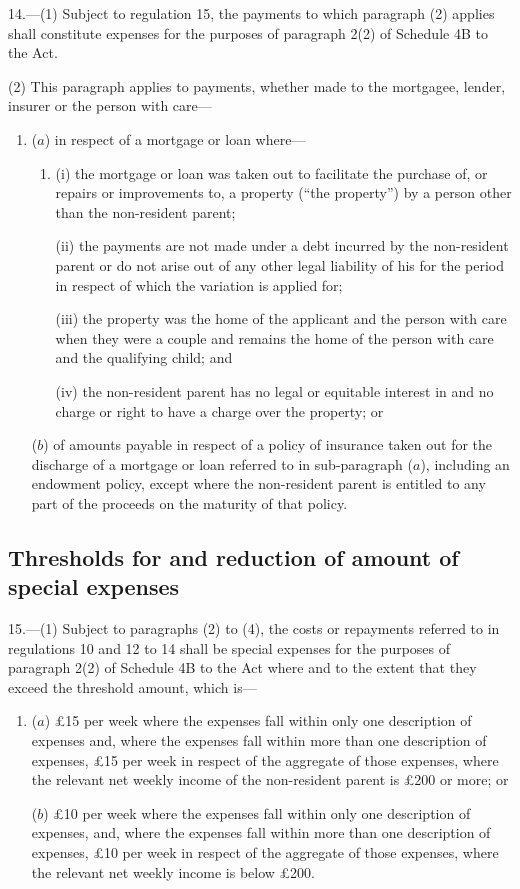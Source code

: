 \documentclass[12pt,a4paper]{article}
\begin{document}
14.---(1)  Subject to regulation 15, the payments to which paragraph (2) applies shall constitute expenses for the purposes of paragraph 2(2) of Schedule 4B to the Act.

(2) This paragraph applies to payments, whether made to the mortgagee, lender, insurer or the person with care—
\begin{enumerate}\item[]
($a$) in respect of a mortgage or loan where—
\begin{enumerate}\item[]
(i) the mortgage or loan was taken out to facilitate the purchase of, or repairs or improvements to, a property (“the property”) by a person other than the non-resident parent;

(ii) the payments are not made under a debt incurred by the non-resident parent or do not arise out of any other legal liability of his for the period in respect of which the variation is applied for;

(iii) the property was the home of the applicant and the person with care when they were a couple and remains the home of the person with care and the qualifying child; and

(iv) the non-resident parent has no legal or equitable interest in and no charge or right to have a charge over the property; or
\end{enumerate}

($b$) of amounts payable in respect of a policy of insurance taken out for the discharge of a mortgage or loan referred to in sub-paragraph ($a$), including an endowment policy, except where the non-resident parent is entitled to any part of the proceeds on the maturity of that policy.
\end{enumerate}

\subsection[15. Thresholds for and reduction of amount of special expenses]{Thresholds for and reduction of amount of special expenses}

15.---(1)  Subject to paragraphs (2) to (4), the costs or repayments referred to in regulations 10 and 12 to 14 shall be special expenses for the purposes of paragraph 2(2) of Schedule 4B to the Act where and to the extent that they exceed the threshold amount, which is—
\begin{enumerate}\item[]
($a$) £15 per week where the expenses fall within only one description of expenses and, where the expenses fall within more than one description of expenses, £15 per week in respect of the aggregate of those expenses, where the relevant net weekly income of the non-resident parent is £200 or more; or

($b$) £10 per week where the expenses fall within only one description of expenses, and, where the expenses fall within more than one description of expenses, £10 per week in respect of the aggregate of those expenses, where the relevant net weekly income is below £200.
\end{enumerate}
\end{document}
